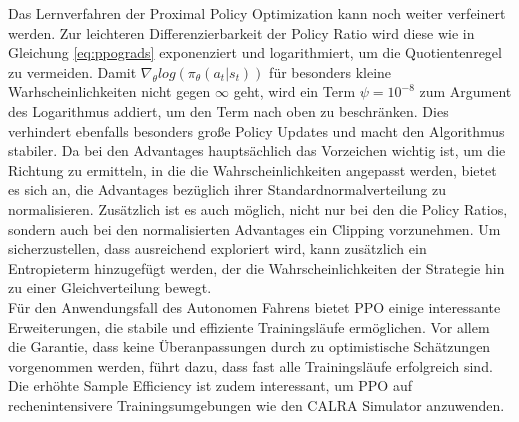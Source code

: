 Das Lernverfahren der Proximal Policy Optimization kann noch weiter verfeinert werden.
Zur leichteren Differenzierbarkeit der Policy Ratio wird diese wie in Gleichung
\ref{eq:ppograds} exponenziert und logarithmiert, um die Quotientenregel zu vermeiden.
Damit $\nabla_\theta log(\pi_\theta(a_t | s_t))$ für besonders kleine Warhscheinlichkeiten
nicht gegen $\infty$ geht, wird ein Term $\psi = 10^{-8}$ zum Argument des
Logarithmus addiert, um den Term nach oben zu beschränken. Dies verhindert ebenfalls
besonders große Policy Updates und macht den Algorithmus stabiler. Da bei den Advantages
hauptsächlich das Vorzeichen wichtig ist, um die Richtung zu ermitteln, in die die
Wahrscheinlichkeiten angepasst werden, bietet es sich an, die Advantages bezüglich
ihrer Standardnormalverteilung zu normalisieren. Zusätzlich ist es auch möglich, nicht
nur bei den die Policy Ratios, sondern auch bei den normalisierten Advantages ein Clipping
vorzunehmen. Um sicherzustellen, dass ausreichend exploriert wird, kann zusätzlich
ein Entropieterm hinzugefügt werden, der die Wahrscheinlichkeiten der Strategie hin
zu einer Gleichverteilung bewegt.\\

Für den Anwendungsfall des Autonomen Fahrens bietet PPO einige interessante
Erweiterungen, die stabile und effiziente Trainingsläufe ermöglichen. Vor allem
die Garantie, dass keine Überanpassungen durch zu optimistische Schätzungen
vorgenommen werden, führt dazu, dass fast alle Trainingsläufe erfolgreich sind.
Die erhöhte Sample Efficiency ist zudem interessant, um PPO auf rechenintensivere
Trainingsumgebungen wie den CALRA Simulator anzuwenden.

